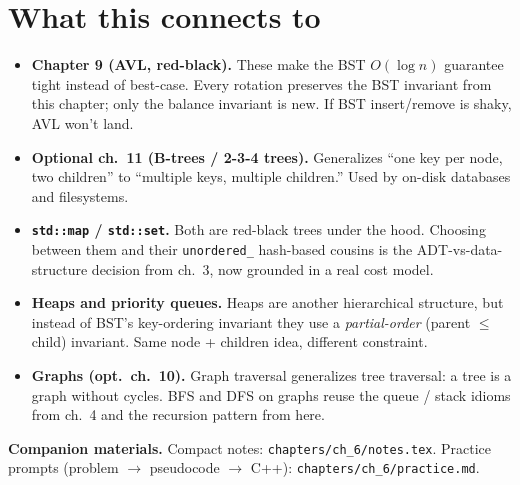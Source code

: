 \documentclass[11pt]{article}
\begin{document}
\section*{What this connects to}

\begin{notebox}
\begin{itemize}
    \item \textbf{Chapter 9 (AVL, red-black).} These make the BST
    $O(\log n)$ guarantee tight instead of best-case. Every rotation
    preserves the BST invariant from this chapter; only the balance
    invariant is new. If BST insert/remove is shaky, AVL won't land.
    \item \textbf{Optional ch.~11 (B-trees / 2-3-4 trees).} Generalizes
    ``one key per node, two children'' to ``multiple keys, multiple
    children.'' Used by on-disk databases and filesystems.
    \item \textbf{\texttt{std::map} / \texttt{std::set}.} Both are
    red-black trees under the hood. Choosing between them and their
    \texttt{unordered\_} hash-based cousins is the ADT-vs-data-structure
    decision from ch.~3, now grounded in a real cost model.
    \item \textbf{Heaps and priority queues.} Heaps are another
    hierarchical structure, but instead of BST's key-ordering invariant
    they use a \emph{partial-order} (parent $\leq$ child) invariant.
    Same node + children idea, different constraint.
    \item \textbf{Graphs (opt.\ ch.~10).} Graph traversal generalizes
    tree traversal: a tree is a graph without cycles. BFS and DFS on
    graphs reuse the queue / stack idioms from ch.~4 and the recursion
    pattern from here.
\end{itemize}
\end{notebox}

\textbf{Companion materials.} Compact notes:
\texttt{chapters/ch\_6/notes.tex}. Practice prompts (problem $\to$
pseudocode $\to$ C++): \texttt{chapters/ch\_6/practice.md}.
\end{document}

